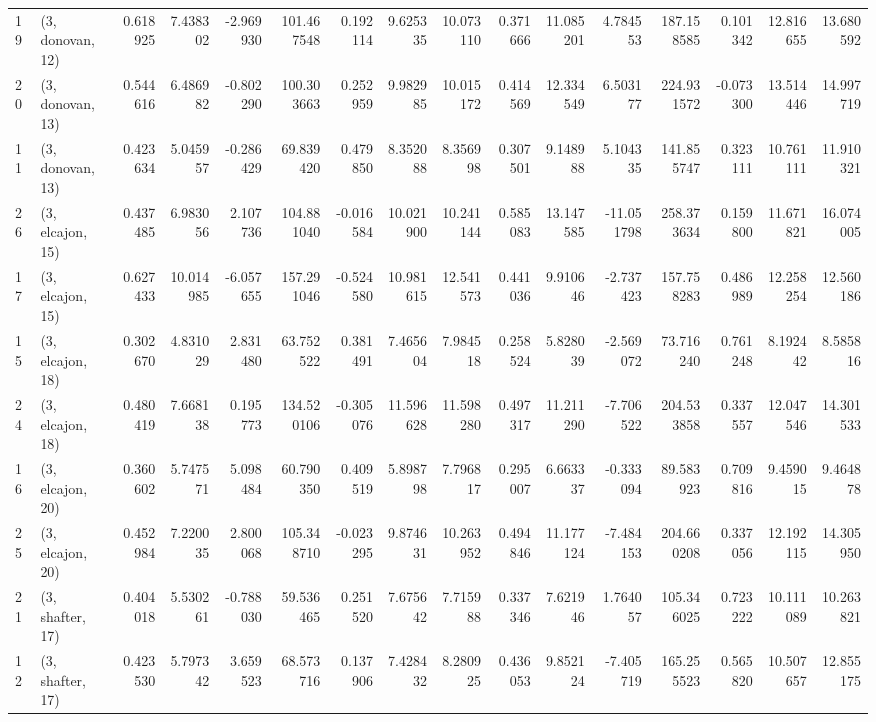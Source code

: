 \begin{tabular}{llrrrrrrrrrrrrrr}
19 &  (3, donovan, 12) &   0.618925 &   7.438302 & -2.969930 &  101.467548 &  0.192114 &   9.625335 &  10.073110 &  0.371666 &  11.085201 &   4.784553 &  187.158585 &  0.101342 &  12.816655 &  13.680592 \\
20 &  (3, donovan, 13) &   0.544616 &   6.486982 & -0.802290 &  100.303663 &  0.252959 &   9.982985 &  10.015172 &  0.414569 &  12.334549 &   6.503177 &  224.931572 & -0.073300 &  13.514446 &  14.997719 \\
11 &  (3, donovan, 13) &   0.423634 &   5.045957 & -0.286429 &   69.839420 &  0.479850 &   8.352088 &   8.356998 &  0.307501 &   9.148988 &   5.104335 &  141.855747 &  0.323111 &  10.761111 &  11.910321 \\
26 &  (3, elcajon, 15) &   0.437485 &   6.983056 &  2.107736 &  104.881040 & -0.016584 &  10.021900 &  10.241144 &  0.585083 &  13.147585 & -11.051798 &  258.373634 &  0.159800 &  11.671821 &  16.074005 \\
17 &  (3, elcajon, 15) &   0.627433 &  10.014985 & -6.057655 &  157.291046 & -0.524580 &  10.981615 &  12.541573 &  0.441036 &   9.910646 &  -2.737423 &  157.758283 &  0.486989 &  12.258254 &  12.560186 \\
15 &  (3, elcajon, 18) &   0.302670 &   4.831029 &  2.831480 &   63.752522 &  0.381491 &   7.465604 &   7.984518 &  0.258524 &   5.828039 &  -2.569072 &   73.716240 &  0.761248 &   8.192442 &   8.585816 \\
24 &  (3, elcajon, 18) &   0.480419 &   7.668138 &  0.195773 &  134.520106 & -0.305076 &  11.596628 &  11.598280 &  0.497317 &  11.211290 &  -7.706522 &  204.533858 &  0.337557 &  12.047546 &  14.301533 \\
16 &  (3, elcajon, 20) &   0.360602 &   5.747571 &  5.098484 &   60.790350 &  0.409519 &   5.898798 &   7.796817 &  0.295007 &   6.663337 &  -0.333094 &   89.583923 &  0.709816 &   9.459015 &   9.464878 \\
25 &  (3, elcajon, 20) &   0.452984 &   7.220035 &  2.800068 &  105.348710 & -0.023295 &   9.874631 &  10.263952 &  0.494846 &  11.177124 &  -7.484153 &  204.660208 &  0.337056 &  12.192115 &  14.305950 \\
21 &  (3, shafter, 17) &   0.404018 &   5.530261 & -0.788030 &   59.536465 &  0.251520 &   7.675642 &   7.715988 &  0.337346 &   7.621946 &   1.764057 &  105.346025 &  0.723222 &  10.111089 &  10.263821 \\
12 &  (3, shafter, 17) &   0.423530 &   5.797342 &  3.659523 &   68.573716 &  0.137906 &   7.428432 &   8.280925 &  0.436053 &   9.852124 &  -7.405719 &  165.255523 &  0.565820 &  10.507657 &  12.855175 \\

\end{tabular}
